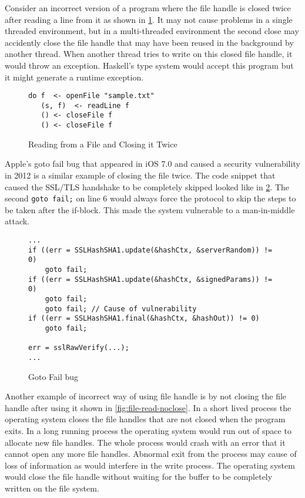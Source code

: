 Consider an incorrect version of a program where the file handle is closed twice after reading a line from it as shown in \cref{fig:file-read-close-2times}.
It may not cause problems in a single threaded environment, but in a multi-threaded environment
the second close may accidently close the file handle that may have been reused in the background by another thread.
When another thread tries to write on this closed file handle, it would throw an exception.
Haskell's type system would accept this program but it might generate a runtime exception.
\begin{figure}[h]
  \begin{framed}
    \begin{verbatim}
do f  <- openFile "sample.txt"
   (s, f)  <- readLine f
   () <- closeFile f
   () <- closeFile f
    \end{verbatim}
  \end{framed}
  \caption{Reading from a File and Closing it Twice}
  \label{fig:file-read-close-2times}
\end{figure}

Apple's goto fail bug that appeared in iOS 7.0 and caused a security vulnerability in 2012 is a similar example of closing the file twice.
The code snippet that caused the SSL/TLS handshake to be completely skipped looked like in \cref{fig:goto-fail}.
The second \texttt{goto fail;} on line 6 would always force the protocol to skip the
steps to be taken after the if-block. This made the system vulnerable to a man-in-middle attack.
\begin{figure}[h]
  \begin{framed}
\begin{verbatim}
...
if ((err = SSLHashSHA1.update(&hashCtx, &serverRandom)) != 0)
    goto fail;
if ((err = SSLHashSHA1.update(&hashCtx, &signedParams)) != 0)
    goto fail;
    goto fail; // Cause of vulnerability
if ((err = SSLHashSHA1.final(&hashCtx, &hashOut)) != 0)
    goto fail;

err = sslRawVerify(...);
...
\end{verbatim}
  \end{framed}
  \caption{Goto Fail bug}
  \label{fig:goto-fail}
\end{figure}

Another example of incorrect way of using file handle is by not closing the file handle after using it shown in \cref{fig:file-read-noclose}.
In a short lived process the operating system closes the file handles that are not closed when the program exits.
In a long running process the operating system would run out of space to allocate new file handles. The whole process would crash with an error that
it cannot open any more file handles. Abnormal exit from the process may cause of loss of information as would interfere in the write process.
The operating system would close the file handle without waiting for the buffer to be completely
written on the file system.

